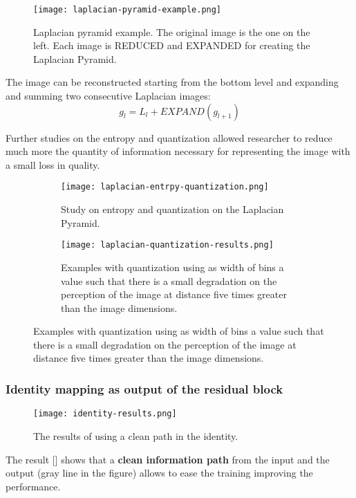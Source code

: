 \begin{figure}[H]
    \centering
    \texttt{[image: laplacian-pyramid-example.png]}
    \caption{Laplacian pyramid example. The original image is the one on the left. Each image is REDUCED and EXPANDED for creating the Laplacian Pyramid.}
\end{figure}

The image can be reconstructed starting from the bottom level and expanding and summing two consecutive Laplacian images:
$$
g_l = L_l + EXPAND(g_{l+1})
$$

Further studies on the entropy and quantization allowed researcher to reduce much more the quantity  of information necessary for representing the image with a small loss in quality.

\begin{figure}[H]
    \begin{subfigure}{\textwidth}
        \centering
        \texttt{[image: laplacian-entrpy-quantization.png]}
        \caption{Study on entropy and quantization on the Laplacian Pyramid.}    
    \end{subfigure}
    \begin{subfigure}{\textwidth}
        \centering
        \texttt{[image: laplacian-quantization-results.png]}
        \caption{Examples with quantization using as width of bins a value such that there is a small degradation on the perception of the image at distance five times greater than the image dimensions.}            
    \end{subfigure}
\end{figure}
\newpage

\subsubsection{Identity mapping as output of the residual block \cite{resnetidentity}}
\begin{figure}[ht]
    \centering
    \texttt{[image: identity-results.png]}
    \caption{The results of using a clean path in the identity.}\label{identity:results}
\end{figure}

The result [] shows that a \textbf{clean information path} from the input and the output (gray line in the figure) allows to ease the training improving the performance.

